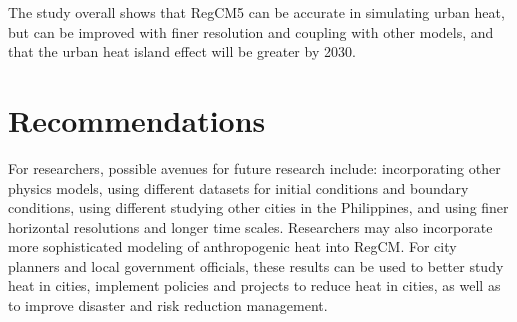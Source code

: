 The study overall shows that RegCM5 can be accurate in simulating urban heat, but can be improved with finer resolution and coupling with other models, and that 
the urban heat island effect will be greater by 2030.
	
\section{Recommendations}
	For researchers, possible avenues for future research include:
	incorporating other physics models, using different datasets for initial conditions and boundary conditions, using different studying other cities in the Philippines, and using finer horizontal resolutions and longer time scales.
	Researchers may also incorporate more sophisticated modeling of anthropogenic heat into RegCM.
	For city planners and local government officials, these results can be used to better study heat in cities, implement policies and projects to reduce heat in cities, as well as to improve disaster and risk reduction management.